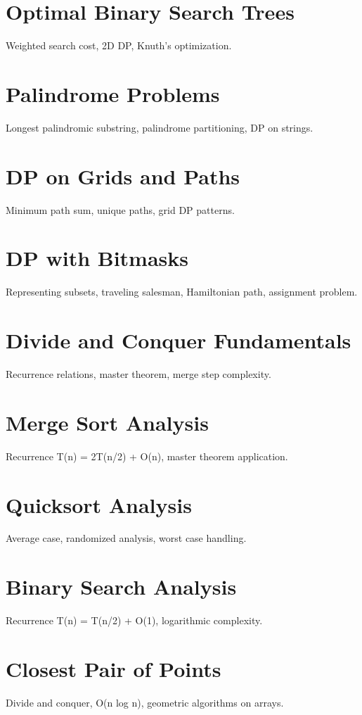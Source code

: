 \chapter{Optimal Binary Search Trees}
Weighted search cost, 2D DP, Knuth's optimization.

\chapter{Palindrome Problems}
Longest palindromic substring, palindrome partitioning, DP on strings.

\chapter{DP on Grids and Paths}
Minimum path sum, unique paths, grid DP patterns.

\chapter{DP with Bitmasks}
Representing subsets, traveling salesman, Hamiltonian path, assignment problem.

\chapter{Divide and Conquer Fundamentals}
Recurrence relations, master theorem, merge step complexity.

\chapter{Merge Sort Analysis}
Recurrence T(n) = 2T(n/2) + O(n), master theorem application.

\chapter{Quicksort Analysis}
Average case, randomized analysis, worst case handling.

\chapter{Binary Search Analysis}
Recurrence T(n) = T(n/2) + O(1), logarithmic complexity.

\chapter{Closest Pair of Points}
Divide and conquer, O(n log n), geometric algorithms on arrays.

